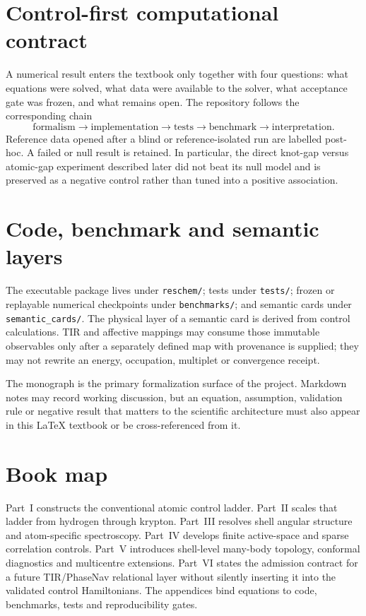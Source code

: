 \section{Control-first computational contract}
A numerical result enters the textbook only together with four questions: what equations were solved, what data were available to the solver, what acceptance gate was frozen, and what remains open.  The repository follows the corresponding chain
\begin{equation}
\text{formalism}\rightarrow\text{implementation}\rightarrow\text{tests}\rightarrow\text{benchmark}\rightarrow\text{interpretation}.
\end{equation}
Reference data opened after a blind or reference-isolated run are labelled post-hoc.  A failed or null result is retained.  In particular, the direct knot-gap versus atomic-gap experiment described later did not beat its null model and is preserved as a negative control rather than tuned into a positive association.

\section{Code, benchmark and semantic layers}
The executable package lives under \texttt{reschem/}; tests under \texttt{tests/}; frozen or replayable numerical checkpoints under \texttt{benchmarks/}; and semantic cards under \texttt{semantic\_cards/}.  The physical layer of a semantic card is derived from control calculations.  TIR and affective mappings may consume those immutable observables only after a separately defined map with provenance is supplied; they may not rewrite an energy, occupation, multiplet or convergence receipt.

The monograph is the primary formalization surface of the project.  Markdown notes may record working discussion, but an equation, assumption, validation rule or negative result that matters to the scientific architecture must also appear in this LaTeX textbook or be cross-referenced from it.

\section{Book map}
Part~I constructs the conventional atomic control ladder.  Part~II scales that ladder from hydrogen through krypton.  Part~III resolves shell angular structure and atom-specific spectroscopy.  Part~IV develops finite active-space and sparse correlation controls.  Part~V introduces shell-level many-body topology, conformal diagnostics and multicentre extensions.  Part~VI states the admission contract for a future TIR/PhaseNav relational layer without silently inserting it into the validated control Hamiltonians.  The appendices bind equations to code, benchmarks, tests and reproducibility gates.
